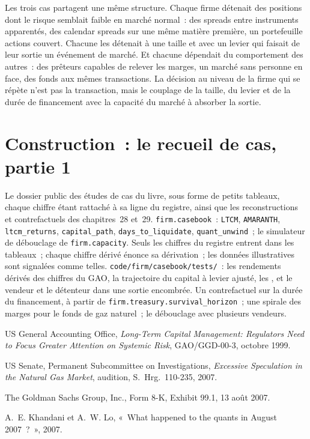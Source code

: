 Les trois cas partagent une même structure. Chaque firme détenait des positions dont le risque semblait faible en marché normal~: des spreads entre instruments apparentés, des calendar
spreads sur une même matière première, un portefeuille actions couvert. Chacune les détenait à une taille et avec un levier qui faisait de leur sortie un événement de marché. Et chacune dépendait
du comportement des autres~: des prêteurs capables de relever les marges, un marché sans personne en face, des fonds aux mêmes transactions. La décision au niveau de la firme
qui se répète n'est pas la transaction, mais le couplage de la taille, du levier et de la durée de financement avec la capacité du marché à absorber la sortie.

\section{Construction~: le recueil de cas, partie 1}\label{bld:fm:case-studies-i:casebook}

\begin{build}
 Le dossier public des études de cas du livre, sous forme de petits tableaux, chaque chiffre étant rattaché à sa ligne du registre, ainsi que les reconstructions et
contrefactuels des chapitres~28 et~29.
 \texttt{firm.casebook}~: \texttt{LTCM}, \texttt{AMARANTH}, \texttt{ltcm\_returns}, \texttt{capital\_path},
\texttt{days\_to\_liquidate}, \texttt{quant\_unwind}~; le simulateur de débouclage de \texttt{firm.capacity}.
 Seuls les chiffres du registre entrent dans les tableaux~; chaque chiffre dérivé énonce sa dérivation~; les données illustratives sont signalées comme telles.
\texttt{code/firm/casebook/tests/}~: les rendements dérivés des chiffres du GAO, la trajectoire du capital à levier ajusté, les , et le vendeur et le détenteur dans une sortie encombrée.
 Un contrefactuel sur la durée du financement, à partir de \texttt{firm.treasury.survival\_horizon}~; une spirale des marges pour le fonds de gaz naturel~; le débouclage avec
plusieurs vendeurs.
\end{build}

\begin{omsources}
\item US General Accounting Office, \emph{Long-Term Capital Management: Regulators Need to Focus Greater Attention on Systemic Risk},
GAO/GGD-00-3, octobre 1999.
\item US Senate, Permanent Subcommittee on Investigations, \emph{Excessive Speculation in the Natural Gas Market}, audition, S.~Hrg.~110-235, 2007.
\item The Goldman Sachs Group, Inc., Form 8-K, Exhibit 99.1, 13 août 2007.
\item A.~E. Khandani et A.~W. Lo, «~What happened to the quants in August 2007~?~», 2007.
\end{omsources}


